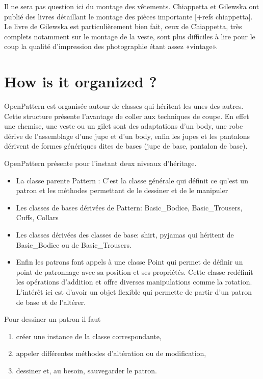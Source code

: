 \documentclass[10pt,a4paper,twoside]{report}
\begin{document}
Il ne sera pas question ici du montage des vêtements. Chiappetta et Gilewska ont publié  des livres détaillant le montage des pièces importante \cite{Gilewska4} [+refs chiappetta]. Le livre de Gilewska est particulièrement bien fait, ceux de Chiappetta, très complets notamment sur le montage de la veste, sont plus difficiles à lire pour le coup la qualité d'impression des photographie étant assez «vintage».

\section{How is it organized ?}

OpenPattern est organisée autour de classes qui héritent les unes des autres. Cette structure présente l'avantage de coller aux techniques de coupe. En effet une chemise, une veste ou un gilet sont des adaptations d'un body, une robe dérive de l'assemblage d'une jupe et d'un body, enfin les jupes et les pantalons dérivent de formes génériques dites de bases (jupe de base, pantalon de base).

OpenPattern présente pour l'instant deux niveaux d'héritage.
\begin{itemize}
\item La classe parente Pattern : C'est la classe générale qui définit ce qu'est un patron et les méthodes permettant de le dessiner et de le manipuler
\item Les classes de bases dérivées de Pattern: Basic\_Bodice, Basic\_Trousers, Cuffs, Collars
\item Les classes dérivées des classes de base: shirt, pyjamas qui héritent de Basic\_Bodice ou de Basic\_Trousers. \item Enfin les patrons font appels à une classe Point qui permet de définir un point de patronnage avec sa position et ses propriétés. Cette classe redéfinit les opérations d'addition et offre diverses manipulations  comme la rotation. L'intérêt ici est d'avoir un objet flexible qui permette de partir d'un patron de base et de l'altérer.
\end{itemize}

Pour dessiner un patron il faut
\begin{enumerate}
\item créer une instance de la classe correspondante,
\item appeler différentes méthodes d'altération ou de modification,
\item dessiner et, au besoin, sauvegarder le patron.
\end{enumerate}
\end{document}
